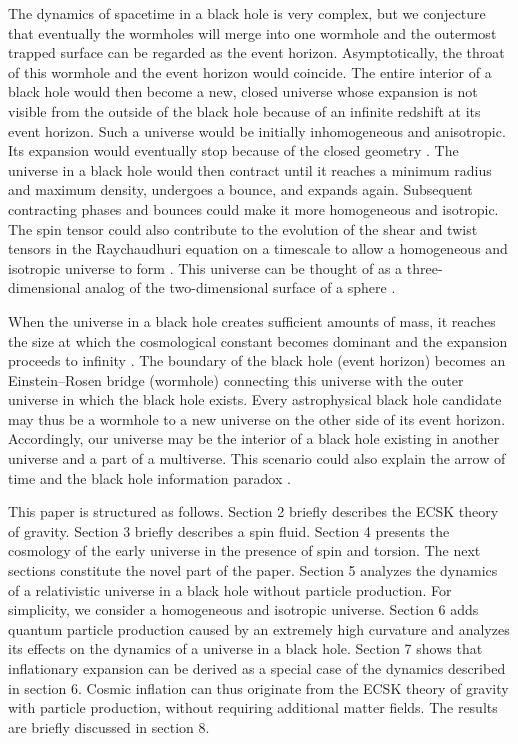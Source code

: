 \documentclass[prd,onecolumn,nofootinbib]{revtex4}
\begin{document}
The dynamics of spacetime in a black hole is very complex, but we conjecture that eventually the wormholes will merge into one wormhole and the outermost trapped surface can be regarded as the event horizon.
Asymptotically, the throat of this wormhole and the event horizon would coincide.
The entire interior of a black hole would then become a new, closed universe whose expansion is not visible from the outside of the black hole because of an infinite redshift at its event horizon.
Such a universe would be initially inhomogeneous and anisotropic.
Its expansion would eventually stop because of the closed geometry \cite{LL2}.
The universe in a black hole would then contract until it reaches a minimum radius and maximum density, undergoes a bounce, and expands again.
Subsequent contracting phases and bounces could make it more homogeneous and isotropic.
The spin tensor could also contribute to the evolution of the shear and twist tensors in the Raychaudhuri equation on a timescale to allow a homogeneous and isotropic universe to form \cite{tech}.
This universe can be thought of as a three-dimensional analog of the two-dimensional surface of a sphere \cite{torsion1}.

When the universe in a black hole creates sufficient amounts of mass, it reaches the size at which the cosmological constant becomes dominant and the expansion proceeds to infinity \cite{Lor}.
The boundary of the black hole (event horizon) becomes an Einstein--Rosen bridge (wormhole) connecting this universe with the outer universe in which the black hole exists.
Every astrophysical black hole candidate may thus be a wormhole to a new universe on the other side of its event horizon.
Accordingly, our universe may be the interior of a black hole existing in another universe and a part of a multiverse.
This scenario could also explain the arrow of time and the black hole information paradox \cite{torsion1,torsion4}.

This paper is structured as follows. Section 2 briefly describes the ECSK theory of gravity.
Section 3 briefly describes a spin fluid.
Section 4 presents the cosmology of the early universe in the presence of spin and torsion.
The next sections constitute the novel part of the paper.
Section 5 analyzes the dynamics of a relativistic universe in a black hole without particle production.
For simplicity, we consider a homogeneous and isotropic universe.
Section 6 adds quantum particle production caused by an extremely high curvature and analyzes its effects on the dynamics of a universe in a black hole.
Section 7 shows that inflationary expansion can be derived as a special case of the dynamics described in section 6.
Cosmic inflation can thus originate from the ECSK theory of gravity with particle production, without requiring additional matter fields. The results are briefly discussed in section 8.\\
\end{document}
